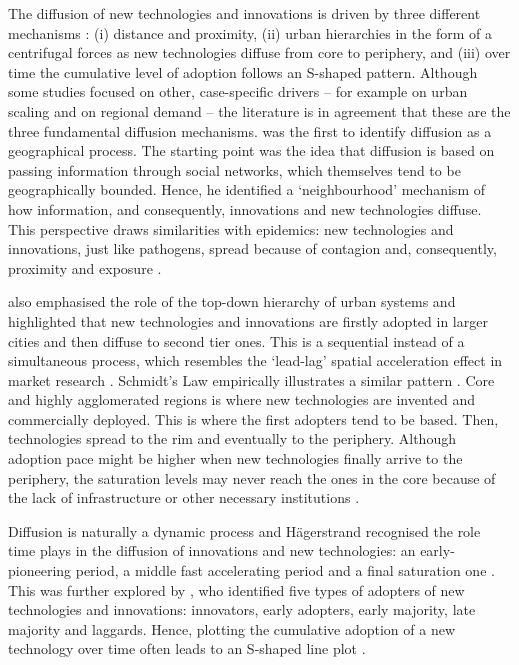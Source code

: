 \documentclass[
  authoryear,
  preprint,
  3p]{elsarticle}
\begin{document}
The diffusion of new technologies and innovations is driven by three
different mechanisms \citep{grubler1990rise, morrill2020spatial}: (i)
distance and proximity, (ii) urban hierarchies in the form of a
centrifugal forces as new technologies diffuse from core to periphery,
and (iii) over time the cumulative level of adoption follows an S-shaped
pattern. Although some studies focused on other, case-specific drivers
-- for example \citet{lengyel2020role} on urban scaling and
\citet{bednarz2020pulled} on regional demand -- the literature is in
agreement that these are the three fundamental diffusion mechanisms.
\citet{hagerstrand1968innovation} was the first to identify diffusion as
a geographical process. The starting point was the idea that diffusion
is based on passing information through social networks, which
themselves tend to be geographically bounded. Hence, he identified a
`neighbourhood' mechanism of how information, and consequently,
innovations and new technologies diffuse. This perspective draws
similarities with epidemics: new technologies and innovations, just like
pathogens, spread because of contagion and, consequently, proximity and
exposure \citep{hivner2003facilitating}.

\citet{hagerstrand1968innovation} also emphasised the role of the
top-down hierarchy of urban systems and highlighted that new
technologies and innovations are firstly adopted in larger cities and
then diffuse to second tier ones. This is a sequential instead of a
simultaneous process, which resembles the `lead-lag' spatial
acceleration effect in market research
\citep{bento2018time, PERES201091}. Schmidt's Law empirically
illustrates a similar pattern \citep{grubler1990rise}. Core and highly
agglomerated regions is where new technologies are invented and
commercially deployed. This is where the first adopters tend to be
based. Then, technologies spread to the rim and eventually to the
periphery. Although adoption pace might be higher when new technologies
finally arrive to the periphery, the saturation levels may never reach
the ones in the core because of the lack of infrastructure or other
necessary institutions \citep{leibowicz2016representing}.

Diffusion is naturally a dynamic process and Hägerstrand recognised the
role time plays in the diffusion of innovations and new technologies: an
early-pioneering period, a middle fast accelerating period and a final
saturation one \citep{morrill2020spatial}. This was further explored by
\citet{rogers2010diffusion}, who identified five types of adopters of
new technologies and innovations: innovators, early adopters, early
majority, late majority and laggards. Hence, plotting the cumulative
adoption of a new technology over time often leads to an S-shaped line
plot \citep{grubler1990rise}.
\end{document}
